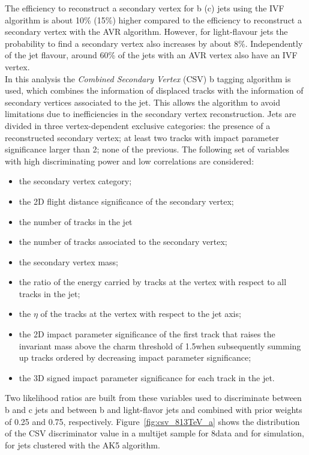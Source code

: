  The efficiency to reconstruct a secondary vertex for b (c) jets using the IVF algorithm is about 10\% (15\%) higher compared to the efficiency to reconstruct a secondary vertex with the AVR algorithm. However, for light-flavour jets the probability to find a secondary vertex also increases by about 8\%. Independently of the jet flavour, around 60\% of the jets with an AVR vertex also have an IVF vertex.\\
 
In this analysis the {\itshape Combined Secondary Vertex} (CSV) b tagging algorithm is used, which combines the information of displaced tracks with the information of secondary vertices associated to the jet.
This allows the algorithm to avoid limitations due to inefficiencies in the secondary vertex reconstruction. Jets are divided in three vertex-dependent exclusive categories: the presence of a reconstructed secondary vertex; at least two tracks with impact parameter significance larger than 2; none of the previous. The following set of variables with high discriminating power and low correlations are considered:

\begin{itemize}
\item the secondary vertex category;
\item the 2D flight distance significance of the secondary vertex;
\item the number of tracks in the jet
\item the number of tracks associated to the secondary vertex;
\item the secondary vertex mass;
\item the ratio of the energy carried by tracks at the vertex with respect to all tracks in the jet;
\item the $\eta$ of the tracks at the vertex with respect to the jet axis;
\item the 2D impact parameter significance of the first track that raises the invariant mass above the charm threshold of 1.5\GeV when subsequently summing up tracks ordered by decreasing impact parameter significance;
\item the 3D signed impact parameter significance for each track in the jet.
\end{itemize}

Two likelihood ratios are built from these variables used to discriminate between b and c jets and between b and light-flavor jets and combined with prior weights of 0.25 and 0.75, respectively. Figure~\ref{fig:csv_813TeV_a} shows the distribution of the CSV discriminator value in a multijet sample for 8\TeV data and for simulation, for jets clustered with the AK5 algorithm.

